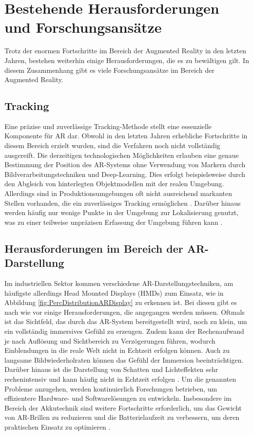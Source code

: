 \section{Bestehende Herausforderungen und Forschungsansätze}
Trotz der enormen Fortschritte im Bereich der Augmented Reality in den letzten
Jahren, bestehen weiterhin einige Herausforderungen, die es zu bewältigen gilt.
In diesem Zusammenhang gibt es viele Forschungsansätze im Bereich der Augmented
Reality.
\subsection{Tracking}
Eine präzise und zuverlässige Tracking-Methode stellt eine essenzielle
Komponente für AR dar. Obwohl in den letzten Jahren erhebliche Fortschritte in
diesem Bereich erzielt wurden, sind die Verfahren noch nicht vollständig
ausgereift. Die derzeitigen technologischen Möglichkeiten erlauben eine genaue
Bestimmung der Position des AR-Systems ohne Verwendung von Markern durch
Bildverarbeitungstechniken und Deep-Learning. Dies erfolgt beispielsweise durch
den Abgleich von hinterlegten Objektmodellen mit der realen
Umgebung.\cite{7907444} Allerdings sind in Produktionsumgebungen oft nicht
ausreichend markanten Stellen vorhanden, die ein zuverlässiges Tracking
ermöglichen \cite{devagiri2022augmented}. Darüber hinaus werden häufig nur
wenige Punkte in der Umgebung zur Lokalisierung genutzt, was zu einer teilweise
unpräzisen Erfassung der Umgebung führen kann \cite{chen2019design}.

\subsection{Herausforderungen im Bereich der AR-Darstellung}

Im industriellen Sektor kommen verschiedene AR-Darstellungstechniken, am
häufigste allerdings Head Mounted Displays (HMDs) zum Einsatz, wie in Abbildung
\ref{fig:PercDistributionARDisplay} zu erkennen ist. Bei diesen gibt es nach
wie vor einige Herausforderungen, die angegangen werden müssen. Oftmals ist das
Sichtfeld, das durch das AR-System bereitgestellt wird, noch zu klein, um ein
vollständig immersives Gefühl zu erzeugen. Zudem kann der Rechenaufwand je nach
Auflösung und Sichtbereich zu Verzögerungen führen, wodurch Einblendungen in
die reale Welt nicht in Echtzeit erfolgen können. Auch zu langsame
Bildwiederholraten können das Gefühl der Immersion beeinträchtigen. Darüber
hinaus ist die Darstellung von Schatten und Lichteffekten sehr rechenintensiv
und kann häufig nicht in Echtzeit erfolgen \cite{zhao2020pointar}. Um die
genannten Probleme anzugehen, werden kontinuierlich Forschungen betrieben, um
effizientere Hardware- und Softwarelösungen zu entwickeln. Insbesondere im
Bereich der Akkutechnik sind weitere Fortschritte erforderlich, um das Gewicht
von AR-Brillen zu reduzieren und die Batterielaufzeit zu verbessern, um deren
praktischen Einsatz zu optimieren \cite{arena2022overview}.

